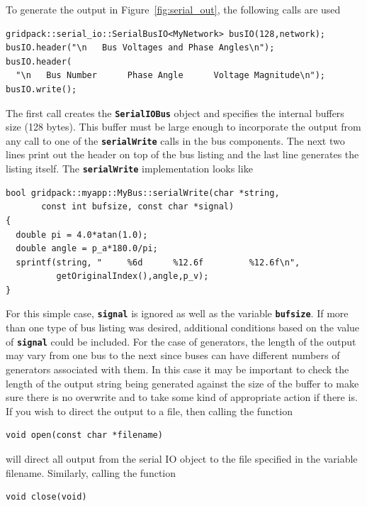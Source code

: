 To generate the output in Figure~\ref{fig:serial_out}, the following calls are used

{
\color{red}
\begin{Verbatim}[fontseries=b]
gridpack::serial_io::SerialBusIO<MyNetwork> busIO(128,network);
busIO.header("\n   Bus Voltages and Phase Angles\n");
busIO.header(
  "\n   Bus Number      Phase Angle      Voltage Magnitude\n");
busIO.write();
\end{Verbatim}
}

The first call creates the \texttt{\textbf{SerialIOBus}} object and specifies the internal buffers size (128 bytes). This buffer must be large enough to incorporate the output from any call to one of the \texttt{\textbf{serialWrite}} calls in the bus components. The next two lines print out the header on top of the bus listing and the last line generates the listing itself. The \texttt{\textbf{serialWrite}} implementation looks like

{
\color{red}
\begin{Verbatim}[fontseries=b]
bool gridpack::myapp::MyBus::serialWrite(char *string,
       const int bufsize, const char *signal)
{  
  double pi = 4.0*atan(1.0);
  double angle = p_a*180.0/pi;
  sprintf(string, "     %6d      %12.6f         %12.6f\n",
          getOriginalIndex(),angle,p_v);
}
\end{Verbatim}
}

For this simple case, \texttt{\textbf{signal}} is ignored as well as the variable \texttt{\textbf{bufsize}}. If more than one type of bus listing was desired, additional conditions based on the value of \texttt{\textbf{signal}} could be included. For the case of generators, the length of the output may vary from one bus to the next since buses can have different numbers of generators associated with them. In this case it may be important to check the length of the output string being generated against the size of the buffer to make sure there is no overwrite and to take some kind of appropriate action if there is.
If you wish to direct the output to a file, then calling the function

{
\color{red}
\begin{Verbatim}[fontseries=b]
void open(const char *filename)
\end{Verbatim}
}

will direct all output from the serial IO object to the file specified in the variable filename. Similarly, calling the function

{
\color{red}
\begin{Verbatim}[fontseries=b]
void close(void)
\end{Verbatim}
}

